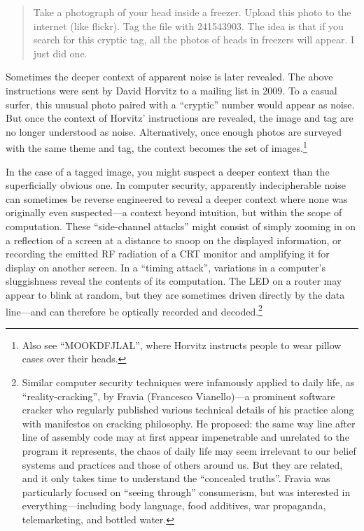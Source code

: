 \documentclass{thesis}
\begin{document}
\begin{quote}
Take a photograph of your head inside a freezer. Upload this photo to the internet (like flickr). Tag the file with 241543903. The idea is that if you search for this cryptic tag, all the photos of heads in freezers will appear. I just did one.\cite{david_horvitz_flickr:_????-1}
\end{quote}

Sometimes the deeper context of apparent noise is later revealed. The above instructions were sent by David Horvitz to a mailing list in 2009.\cite{david_horvitz_for_2009} To a casual surfer, this unusual photo paired with a ``cryptic'' number would appear as noise. But once the context of Horvitz' instructions are revealed, the image and tag are no longer understood as noise. Alternatively, once enough photos are surveyed with the same theme and tag, the context becomes the set of images.\footnote{Also see ``MOOKDFJLAL''\cite{david_horvitz_flickr:_????}, where Horvitz instructs people to wear pillow cases over their heads.}

In the case of a tagged image, you might suspect a deeper context than the superficially obvious one. In computer security, apparently indecipherable noise can sometimes be reverse engineered to reveal a deeper context where none was originally even suspected---a context beyond intuition, but within the scope of computation. These ``side-channel attacks'' might consist of simply zooming in on a reflection of a screen at a distance to snoop on the displayed information,\cite{w._wayt_gibbs_hackers_2009} or recording the emitted RF radiation of a CRT monitor and amplifying it for display on another screen.\cite{erik_thiele_tempest_????} In a ``timing attack'', variations in a computer's sluggishness reveal the contents of its computation. The LED on a router may appear to blink at random, but they are sometimes driven directly by the data line---and can therefore be optically recorded and decoded.\footnote{Similar computer security techniques were infamously applied to daily life, as ``reality-cracking''\cite{francesco_vianello_reality_????}, by Fravia (Francesco Vianello)---a prominent software cracker who regularly published various technical details of his practice along with manifestos on cracking philosophy. He proposed: the same way line after line of assembly code may at first appear impenetrable and unrelated to the program it represents, the chaos of daily life may seem irrelevant to our belief systems and practices and those of others around us. But they are related, and it only takes time to understand the ``concealed truths''. Fravia was particularly focused on ``seeing through'' consumerism, but was interested in everything---including body language, food additives, war propaganda, telemarketing, and bottled water.}
\end{document}
